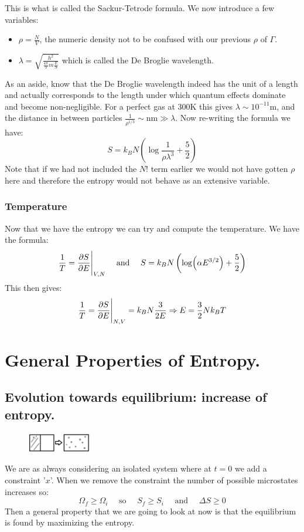 \documentclass[10pt,a4paper]{book}
\begin{document}
This is what is called the Sackur-Tetrode formula. We now introduce a few variables:
\begin{itemize}
\item $\rho = \frac{N}{V}$, the numeric density not to be confused with our previous $\rho$ of $\Gamma$.
\item $\lambda = \sqrt{\frac{h^2}{\frac{4\pi}{3}m \frac{E}{N}}}$ which is called the De Broglie wavelength.
\end{itemize}
As an aside, know that the De Broglie wavelength indeed has the unit of a length and actually corresponds to the length under which quantum effects dominate and become non-negligible. For a perfect gas at 300K this gives $\lambda \sim 10^{-11} \text{m}$, and the distance in between particles $\frac{1}{\rho^{1/3}} \sim \text{nm} \gg \lambda$. Now re-writing the formula we have:
\begin{equation}
S = k_B N \left(\log\frac{1}{\rho\lambda^3} + \frac{5}{2}\right)
\end{equation}
Note that if we had not included the $N!$ term earlier we would not have gotten $\rho$ here and therefore the entropy would not behave as an extensive variable.
\subsubsection{Temperature}
Now that we have the entropy we can try and compute the temperature. We have the formula:
\[
\frac{1}{T} = \pdv{S}{E}\Bigg|_{V,N} \quad \text{ and } \quad S = k_B N\left(\log(\alpha E^{3/2}) + \frac{5}{2}\right)
\]
This then gives:
\[
\frac{1}{T} = \pdv{S}{E}\Bigg|_{N,V} = k_B N \frac{3}{2E} \Rightarrow E = \frac{3}{2}Nk_B T
\]

\section{General Properties of Entropy.}
\subsection{Evolution towards equilibrium: increase of entropy.}
\begin{figure}
    \includegraphics[width=0.25\textwidth]{graphs/ChangeEx}
\end{figure}
We are as always considering an isolated system where at $t = 0$ we add a constraint '$x$'. When we remove the constraint the number of possible microstates increases so:
\[
\Omega_f \geq \Omega_i \quad \text{ so } \quad S_f \geq S_i \quad \text{ and } \quad \Delta S \geq 0
\]
Then a general property that we are going to look at now is that the equilibrium is found by maximizing the entropy.
\end{document}
